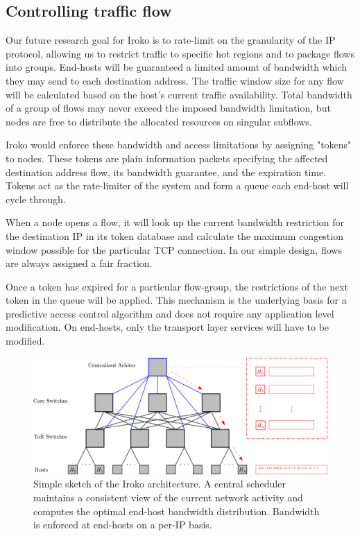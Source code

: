\subsection{Controlling traffic flow}
Our future research goal for Iroko is to rate-limit on the granularity of the IP protocol, allowing us 
to restrict traffic to specific hot regions and to package flows into groups.
End-hosts will be guaranteed a limited amount of bandwidth which they may send to 
each destination address. The traffic window size for any flow will be calculated 
based on the host's current traffic availability. Total bandwidth of a group of 
flows may never exceed the imposed bandwidth limitation, but nodes are free to 
distribute the allocated resources on singular subflows.

Iroko would enforce these bandwidth and access limitations by assigning "tokens" to nodes. These tokens are plain information packets 
specifying the affected destination address flow, its bandwidth guarantee, and 
the expiration time. Tokens act as the rate-limiter of the system and form a 
queue each end-host will cycle through.

When a node opens a flow, it will look up the current bandwidth restriction for 
the destination IP in its token database and calculate the maximum congestion 
window possible for the particular TCP connection. In our simple design, flows 
are always assigned a fair fraction.

Once a token has expired for a particular flow-group, the restrictions of the 
next token in the queue will be applied. This mechanism is the underlying basis 
for a predictive access control algorithm and does not require any application 
level modification. On end-hosts, only the transport layer services will have 
to be modified.

\begin{figure}
\centering
\includegraphics[width=1\linewidth]{Topology3}
\caption{Simple sketch of the Iroko architecture. A central scheduler maintains 
a consistent view of the current network activity and computes the optimal 
end-host bandwidth distribution. Bandwidth is enforced at end-hosts on a per-IP 
basis.}
\label{fig:Topology3}
\end{figure}



